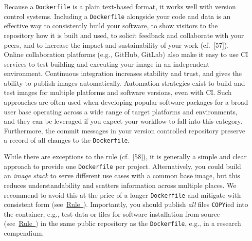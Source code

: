 \documentclass[10pt,letterpaper]{article}
\begin{document}
  \label{rule:publish} 

Because a \texttt{Dockerfile} is a plain text-based format, it works
well with version control systems. Including a \texttt{Dockerfile}
alongside your code and data is an effective way to consistently build
your software, to show visitors to the repository how it is built and
used, to solicit feedback and collaborate with your peers, and to
increase the impact and sustainability of your work (cf.~{[}57{]}).
Online collaboration platforms (e.g., GitHub, GitLab) also make it easy
to use CI services to test building and executing your image in an
independent environment. Continuous integration increases stability and
trust, and gives the ability to publish images automatically. Automation
strategies exist to build and test images for multiple platforms and
software versions, even with CI. Such approaches are often used when
developing popular software packages for a broad user base operating
across a wide range of target platforms and environments, and they can
be leveraged if you expect your workflow to fall into this category.
Furthermore, the commit messages in your version controlled repository
preserve a record of all changes to the \texttt{Dockerfile}.

While there are exceptions to the rule (cf.~{[}58{]}), it is generally a
simple and clear approach to provide one \texttt{Dockerfile} per
project. Alternatively, you could build an \emph{image stack} to serve
different use cases with a common base image, but this reduces
understandability and scatters information across multiple places. We
recommend to avoid this at the price of a longer \texttt{Dockerfile} and
mitigate with consistent form
(see~\hyperref[{rule:formatting}]{Rule~}).
Importantly, you should publish \emph{all} files \texttt{COPY}ied into
the container, e.g., test data or files for software installation from
source (see~\hyperref[{rule:mount}]{Rule~}) in the
same public repository as the \texttt{Dockerfile}, e.g., in a research
compendium.
\end{document}
